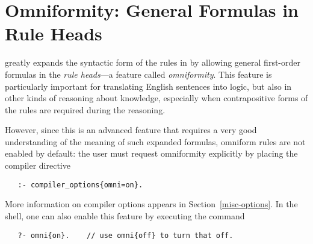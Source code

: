 

\section{Omniformity: General Formulas in Rule Heads}\label{sec-omniform} 

\index{\url{==>}}
\index{\url{<==}}
\ERGO greatly expands the syntactic form of the rules in \FLORA
by allowing
general first-order formulas in the \emph{rule heads}---a feature called
\emph{omniformity}. 
This feature is
particularly important for translating English sentences into logic, but
also in other kinds of reasoning about knowledge, especially 
when contrapositive forms of the rules are required during the reasoning.

However, since this is an advanced feature that requires a very good
understanding of the meaning of such expanded formulas, omniform rules are
not enabled by default: the user must request omniformity explicitly by
placing the compiler directive
\begin{verbatim}
   :- compiler_options{omni=on}.
\end{verbatim}
More information on compiler options appears in Section~\ref{misc-options}.
In the \ERGO shell, one can also enable this feature by executing the command
\begin{verbatim}
   ?- omni{on}.    // use omni{off} to turn that off.
\end{verbatim}

